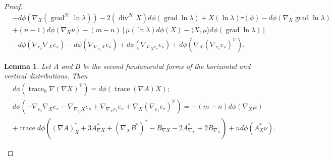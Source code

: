\documentclass[12pt]{amsart}
\theoremstyle{plain}
\newtheorem{lem}{Lemma}
\theoremstyle{definition}
\begin{document}
\begin{proof}
\begin{align*}
&-d\phi(\nabla_{X} (\operatorname{grad}^{\mathcal{H}}\ln\lambda)) -2 (\operatorname{div}^{\mathcal{H}} X) d\phi(\operatorname{grad} \ln\lambda)
+ X(\ln \lambda)\tau(\phi) - d\phi (\nabla_{X} \operatorname{grad} \ln\lambda) \\
& + (n-1) d\phi(\nabla_{X} \nu)  - (m-n)[ \mu(\ln\lambda) d\phi(X) - \langle X, \mu \rangle d\phi(\operatorname{grad}\ln\lambda)] \\
& - d\phi(\nabla_{e_{s}}\nabla_{X} e_{s}) - d\phi(\nabla_{\nabla_{e_{s}}X}e_{s}) +
d\phi(\nabla_{\nabla_{X}e_{s}}e_{s})+ d\phi (\nabla_{X}(\nabla_{e_{s}}e_{s})^{\mathcal{V}} ).
\end{align*}

\begin{lem}
Let $A$ and $B$ be the second fundamental forms of the horizontal and vertical
distributions. Then
\begin{align*}
&d\phi(\operatorname{trace}_{h} \nabla (\nabla X)^{\mathcal{V}}) = d\phi(\operatorname{trace} (\nabla A)X) ;\\
&d\phi(-\nabla_{e_{s}}\nabla_{X} e_{s} - \nabla_{\nabla_{e_{s}}X}e_{s}
+ \nabla_{\nabla_{X}e_{s}}e_{s} + \nabla_{X}(\nabla_{e_{s}}e_{s})^{\mathcal{V}}) = -(m-n)d\phi(\nabla_{X}\mu) \\
&+ \operatorname{trace} d\phi( (\nabla A)^{*}_{X} + 3 A^{*}_{\nabla X} + (\nabla_{X} B^{*})^{*} -
B_{\nabla X} -2A^{*}_{\nabla_{X}}  + 2 B_{\nabla_{X}}) + n d\phi(A^{*}_{X}\nu).
\end{align*}
\end{lem}


\end{proof}
\end{document}
